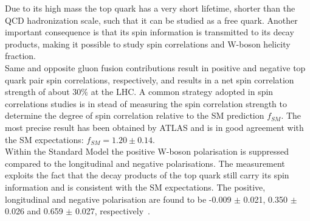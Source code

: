 Due to its high mass the top quark has a very short lifetime, shorter than the QCD hadronization scale, such that it can be studied as a free quark. Another important consequence is that its spin information is transmitted to its decay products, making it possible to study spin correlations and W-boson helicity fraction.
\\
Same and opposite gluon fusion contributions result in positive and negative top quark pair spin correlations, respectively, and results in a net spin correlation strength of about $30 \%$ at the LHC.
A common strategy adopted in spin correlations studies is in stead of measuring the spin correlation strength to determine the degree of spin correlation relative to the SM prediction $f_{SM}$. 
The most precise result has been obtained by ATLAS and is in good agreement with the SM expectations: $f_{SM} = 1.20 \pm 0.14$.
\\
Within the Standard Model the positive W-boson polarisation is suppressed compared to the longitudinal and negative polarisations. 
The measurement exploits the fact that the decay products of the top quark still carry its spin information and is consistent with the SM expectations.
The positive, longitudinal and negative polarisation are found to be -0.009 $\pm$ 0.021, 0.350 $\pm$ 0.026 and 0.659 $\pm$ 0.027, respectively~\cite{CMSWHelicity}.

